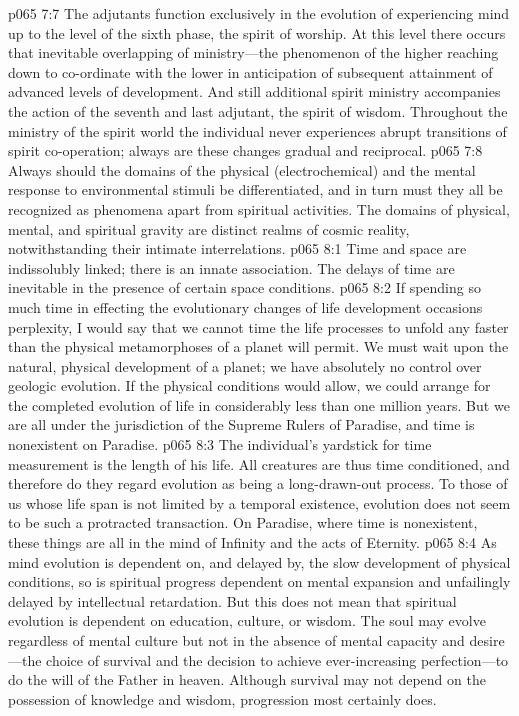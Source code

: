 \vs p065 7:7 The adjutants function exclusively in the evolution of experiencing mind up to the level of the sixth phase, the spirit of worship. At this level there occurs that inevitable overlapping of ministry---the phenomenon of the higher reaching down to co\hyp{}ordinate with the lower in anticipation of subsequent attainment of advanced levels of development. And still additional spirit ministry accompanies the action of the seventh and last adjutant, the spirit of wisdom. Throughout the ministry of the spirit world the individual never experiences abrupt transitions of spirit co\hyp{}operation; always are these changes gradual and reciprocal.
\vs p065 7:8 Always should the domains of the physical (electrochemical) and the mental response to environmental stimuli be differentiated, and in turn must they all be recognized as phenomena apart from spiritual activities. The domains of physical, mental, and spiritual gravity are distinct realms of cosmic reality, notwithstanding their intimate interrelations.
%
\vs p065 8:1 Time and space are indissolubly linked; there is an innate association. The delays of time are inevitable in the presence of certain space conditions.
\vs p065 8:2 If spending so much time in effecting the evolutionary changes of life development occasions perplexity, I would say that we cannot time the life processes to unfold any faster than the physical metamorphoses of a planet will permit. We must wait upon the natural, physical development of a planet; we have absolutely no control over geologic evolution. If the physical conditions would allow, we could arrange for the completed evolution of life in considerably less than one million years. But we are all under the jurisdiction of the Supreme Rulers of Paradise, and time is nonexistent on Paradise.
\vs p065 8:3 The individual’s yardstick for time measurement is the length of his life. All creatures are thus time conditioned, and therefore do they regard evolution as being a long\hyp{}drawn\hyp{}out process. To those of us whose life span is not limited by a temporal existence, evolution does not seem to be such a protracted transaction. On Paradise, where time is nonexistent, these things are all  in the mind of Infinity and the acts of Eternity.
\vs p065 8:4 As mind evolution is dependent on, and delayed by, the slow development of physical conditions, so is spiritual progress dependent on mental expansion and unfailingly delayed by intellectual retardation. But this does not mean that spiritual evolution is dependent on education, culture, or wisdom. The soul may evolve regardless of mental culture but not in the absence of mental capacity and desire---the choice of survival and the decision to achieve ever\hyp{}increasing perfection---to do the will of the Father in heaven. Although survival may not depend on the possession of knowledge and wisdom, progression most certainly does.
